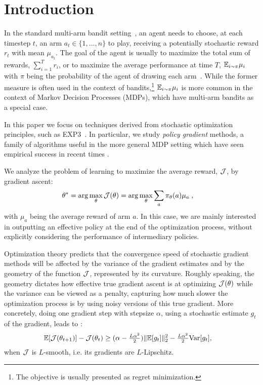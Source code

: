 \section{Introduction}
In the standard multi-arm bandit setting~\cite{robbins1952some}, an agent needs to choose, at each timestep $t$, an arm $a_t \in \{1, ..., n\}$ to play, receiving a potentially stochastic reward $r_t$ with mean $\mu_{a_t}$. The goal of the agent is usually to maximize the total sum of rewards, $\sum_{i=1}^T r_i$, or to maximize the average performance at time $T$, $\mathbb{E}_{i\sim \pi} \mu_i$ with $\pi$ being the probability of the agent of drawing each arm~\citep{bubeck2012regret}. While the former measure is often used in the context of bandits,\footnote{The objective is usually presented as regret minimization.} $\mathbb{E}_{i\sim \pi} \mu_i$ is more common in the context of Markov Decision Processes (MDPs), which have multi-arm bandits as a special case.

In this paper we focus on techniques derived from stochastic optimization principles, such as EXP3~\citep{auer2002nonstochastic, seldin2013evaluation}. %
In particular, we study \textit{policy gradient} methods, a family of algorithms useful in the more general MDP setting which have seen empirical success in recent times \cite{schulman2017proximal}. 


We analyze the problem of learning to maximize the average reward, ${\mathcal{J}}$, by gradient ascent:
\begin{align}
    \theta^\ast &= \arg\max_\theta {\mathcal{J}}(\theta)
    = \arg\max_\theta \sum_{a} \pi_\theta(a) \mu_a \; , \label{eq:bandit_loss} 
\end{align} 
with $\mu_a$ being the average reward of arm $a$.
In this case, we are mainly interested in outputting an effective policy at the end of the optimization process, without explicitly considering the performance of intermediary policies.%


Optimization theory predicts that the convergence speed of stochastic gradient methods will be affected by the variance of the gradient estimates and by the geometry of the function ${\mathcal{J}}$, represented by its curvature. Roughly speaking, the geometry dictates how effective true gradient ascent is at optimizing ${\mathcal{J}}(\theta)$ while the variance can be viewed as a penalty, capturing how much slower the optimization process is by using noisy versions of this true gradient. More concretely, doing one gradient step with stepsize $\alpha$, using a stochastic estimate $g_t$ of the gradient, leads to \citep{bottou2018optimization}:
\begin{align*}\mathbb{E}[{\mathcal{J}}(\theta_{t+1})] - {\mathcal{J}}(\theta_t) &\geq (\alpha - \tfrac{L \alpha^2}{2}) \|\mathbb{E} [g_t] \|^2_2  - \tfrac{ L \alpha^2}{2} \text{Var}[g_t ],\end{align*}
when ${\mathcal{J}}$ is $L$-smooth, i.e. its gradients are $L$-Lipschitz. 

